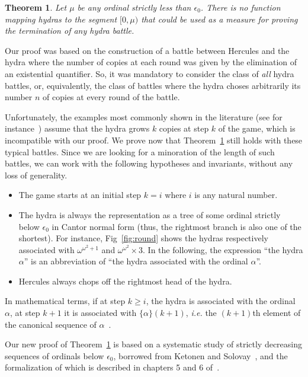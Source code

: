 \documentclass{easychair}
\newtheorem{theorem}{Theorem}
\newcommand{\canonseq}[2]{\mbox{$\{#1\}(#2)$}}
\begin{document}
\begin{theorem}
  Let $\mu$ be any ordinal strictly less than $\epsilon_0$.
  There is no function mapping hydras to the segment $[0,\mu)$ that could be used as a measure for  proving the termination of  \emph{any} hydra battle.\label{thm3}
\end{theorem}

Our proof was based on the construction of a battle between Hercules and the hydra where the
number of copies at each round was given by the elimination of an existential quantifier. So, it was mandatory to consider the class of \emph{all} hydra battles, or, equivalently, the class of battles where the hydra choses arbitrarily its number $n$ of copies at every round of the battle.

Unfortunately, the examples  most commonly shown in the literature
(see for instance~\cite{KP82, bauer2008, BauerHydra}) 
assume that the hydra grows $k$ copies at step $k$ of the game, which is incompatible with our proof.
We prove now that Theorem~\ref{thm3} still holds with these typical battles.
Since we are looking  for a minoration of the length of such battles,
we can work with the following hypotheses and invariants, 
without any loss of generality.
 
 \begin{itemize}
   \item The game starts at an initial step $k=i$ where $i$ is any natural number.
   \item  The hydra is always the  representation as a tree of some ordinal strictly below $\epsilon_0$ in Cantor normal
     form (thus, the rightmost branch is also one of the shortest).
     For instance, Fig~\ref{fig:round} shows the hydras respectively associated with  $\omega^{\omega^2+1}$ and $\omega^{\omega^2}\times 3$.
     In the following,  the expression  ``the hydra $\alpha$'' is an abbreviation of ``the hydra associated with the ordinal $\alpha$''.
 
 \item Hercules always chops off the rightmost head of the hydra.
 \end{itemize}
 
 In mathematical terms, if at step $k\geq i$, the hydra is associated with the ordinal $\alpha$, at step $k+1$ it is associated with
 $\canonseq{\alpha}{k+1}$, \emph{i.e.} the $(k+1)$th element of the canonical sequence of $\alpha$~\cite{KS81}.

 Our new proof of Theorem~\ref{thm3} is based on a systematic study of strictly decreasing sequences of ordinals below $\epsilon_0$, borrowed from Ketonen and Solovay~\cite{KS81}, and the formalization of which is described  in chapters 5 and 6 of~\cite{HydraBook}.
 
\end{document}
